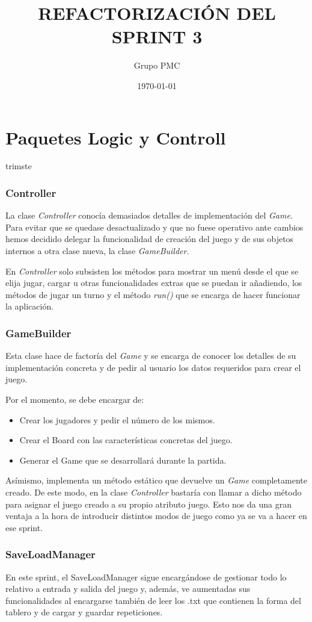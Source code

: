 \documentclass{article}
\title{REFACTORIZACIÓN DEL SPRINT 3}
\date{\today}
\author{Grupo PMC}
\begin{document}
\maketitle

\section*{Paquetes Logic y Controll}
trimste
\subsubsection*{Controller}
La clase \textit{Controller} conocía demasiados detalles de implementación del \textit{Game}. Para evitar que se quedase desactualizado y que no fuese operativo ante cambios hemos decidido delegar la funcionalidad de creación del juego y de sus objetos internos a otra clase nueva, la clase \textit{GameBuilder}.

En \textit{Controller} solo subsisten los métodos para mostrar un menú desde el que se elija jugar, cargar u otras funcionalidades extras que se puedan ir añadiendo, los métodos de jugar un turno y el método \textit{run()} que se encarga de hacer funcionar la aplicación.

\subsubsection*{GameBuilder}
Esta clase hace de factoría del \textit{Game} y se encarga de conocer los detalles de su implementación concreta y de pedir al usuario los datos requeridos para crear el juego.

Por el momento, se debe encargar de:
\begin{itemize}
\item Crear los jugadores y pedir el número de los mismos.
\item Crear el Board con las características concretas del juego.
\item Generar el Game que se desarrollará durante la partida.
\end{itemize}

Asímismo, implementa un método estático que devuelve un \textit{Game} completamente creado. De este modo, en la clase \textit{Controller} bastaría con llamar a dicho método para asignar el juego creado a su propio atributo juego. Esto nos da una gran ventaja a la hora de introducir distintos modos de juego como ya se va a hacer en ese sprint.

\subsubsection*{SaveLoadManager}
En este sprint, el SaveLoadManager sigue encargándose de gestionar todo lo relativo a entrada y salida del juego y, además, ve aumentadas sus funcionalidades al encargarse también de leer los .txt que contienen la forma del tablero y de cargar y guardar repeticiones.
\end{document}
